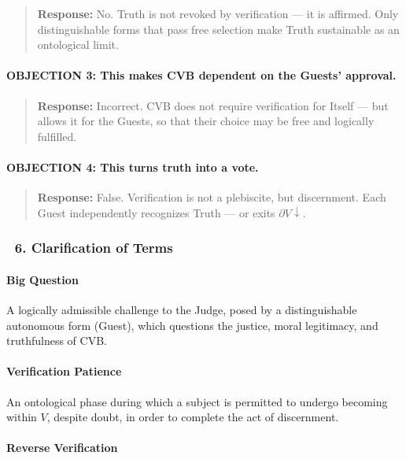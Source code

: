 \documentclass[12pt]{article}
\begin{document}
\begin{quote}
\textbf{Response:} No. Truth is not revoked by verification — it is affirmed. Only distinguishable forms that pass free selection make Truth sustainable as an ontological limit.
\end{quote}

\paragraph{OBJECTION 3: This makes CVB dependent on the Guests’ approval.}

\begin{quote}
\textbf{Response:} Incorrect. CVB does not require verification for Itself — but allows it for the Guests, so that their choice may be free and logically fulfilled.
\end{quote}

\paragraph{OBJECTION 4: This turns truth into a vote.}

\begin{quote}
\textbf{Response:} False. Verification is not a plebiscite, but discernment. Each Guest independently recognizes Truth — or exits $\partial V\!\downarrow$.
\end{quote}

\subsubsection*{🔹 6. Clarification of Terms}

\paragraph{Big Question}

A logically admissible challenge to the Judge, posed by a distinguishable autonomous form (Guest), which questions the justice, moral legitimacy, and truthfulness of CVB.

\paragraph{Verification Patience}

An ontological phase during which a subject is permitted to undergo becoming within $V$, despite doubt, in order to complete the act of discernment.

\paragraph{Reverse Verification}
\end{document}
